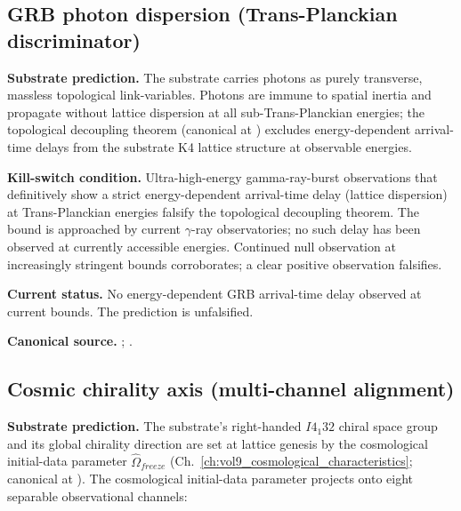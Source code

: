 \subsection{GRB photon dispersion (Trans-Planckian discriminator)}
\label{subsec:vol9_grb_dispersion}

\textbf{Substrate prediction.} The substrate carries photons as purely transverse, massless topological link-variables. Photons are immune to spatial inertia and propagate without lattice dispersion at all sub-Trans-Planckian energies; the topological decoupling theorem (canonical at ) excludes energy-dependent arrival-time delays from the substrate K4 lattice structure at observable energies.

\textbf{Kill-switch condition.} Ultra-high-energy gamma-ray-burst observations that definitively show a strict energy-dependent arrival-time delay (lattice dispersion) at Trans-Planckian energies falsify the topological decoupling theorem. The bound is approached by current $\gamma$-ray observatories; no such delay has been observed at currently accessible energies. Continued null observation at increasingly stringent bounds corroborates; a clear positive observation falsifies.

\textbf{Current status.} No energy-dependent GRB arrival-time delay observed at current bounds. The prediction is unfalsified.

\textbf{Canonical source.} ; .

\subsection{Cosmic chirality axis (multi-channel alignment)}
\label{subsec:vol9_cosmic_chirality_null}

\textbf{Substrate prediction.} The substrate's right-handed $I4_1 32$ chiral space group and its global chirality direction are set at lattice genesis by the cosmological initial-data parameter $\hat{\Omega}_{freeze}$ (Ch.~\ref{ch:vol9_cosmological_characteristics}; canonical at ). The cosmological initial-data parameter projects onto eight separable observational channels:

